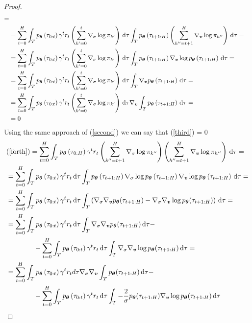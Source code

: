 \begin{proof}
\begin{align*}
=\\ &= 
\sum_{t=0}^{H}\int_{T}p_{{\boldsymbol{\theta}}}\left(\tau_{0:t}\right)\gamma^{t}r_{t}\left(\sum_{k'=0}^{t}\nabla_{\sigma}\log\pi_{k'}\right)\, \textrm{d}\tau
\int_{T}p_{{\boldsymbol{\theta}}}\left(\tau_{t+1:H}\right)\left(\sum_{h''=t+1}^{H}\nabla_{\boldsymbol{v}}\log\pi_{h''}\right)\, \textrm{d}\tau 
=\\ &= 
\sum_{t=0}^{H}\int_{T}p_{{\boldsymbol{\theta}}}\left(\tau_{0:t}\right)\gamma^{t}r_{t}\left(\sum_{k'=0}^{t}\nabla_{\sigma}\log\pi_{k'}\right)\, \textrm{d}\tau\int_{T}p_{{\boldsymbol{\theta}}}\left(\tau_{t+1:H}\right)\nabla_{\boldsymbol{v}}\log p_{{\boldsymbol{\theta}}}\left(\tau_{t+1:H}\right)\, \textrm{d}\tau
=\\ &=
\sum_{t=0}^{H}\int_{T}p_{{\boldsymbol{\theta}}}\left(\tau_{0:t}\right)\gamma^{t}r_{t}\left(\sum_{k'=0}^{t}\nabla_{\sigma}\log\pi_{k'}\right)\, \textrm{d}\tau\int_{T}\nabla_{\boldsymbol{v}} p_{{\boldsymbol{\theta}}}\left(\tau_{t+1:H}\right)\, \textrm{d}\tau
=\\ &=
\sum_{t=0}^{H}\int_{T}p_{{\boldsymbol{\theta}}}\left(\tau_{0:t}\right)\gamma^{t}r_{t}\left(\sum_{k'=0}^{t}\nabla_{\sigma}\log\pi_{k'}\right)\, \textrm{d}\tau\nabla_{\boldsymbol{v}}\int_{T} p_{{\boldsymbol{\theta}}}\left(\tau_{t+1:H}\right)\, \textrm{d}\tau
=\\ &= 0
\end{align*}
\normalsize
\allowdisplaybreaks[0]
Using the same approach of (\ref{second}) we can say that (\ref{third}) = 0
\allowdisplaybreaks
\small
\begin{align*}
&(\ref{forth})
=
\sum_{t=0}^{H}\int_{T}p_{\vtheta}\left(\tau_{0:H}\right)\gamma^{t}r_{t}\left(\gradlogsumpi{k''}{t+1}{H}{\sigma} \right)\left(\gradlogsumpi{h''}{t+1}{H}{\vv} \right)\de\tau
= \\ &=
\sum_{t=0}^{H}\int_{T}p_{\vtheta}\left(\tau_{0:t}\right)\gamma^{t}r_{t}\de\tau\int_{T}p_{\vtheta}\left(\tau_{t+1:H}\right)\nabla_{\sigma}\log p_{\vtheta}\left(\tau_{t+1:H}\right)\nabla_{\vv}\log p_{\vtheta}\left(\tau_{t+1:H}\right)\de\tau
= \\ &=
\sum_{t=0}^{H}\int_{T}p_{\vtheta}\left(\tau_{0:t}\right)\gamma^{t}r_{t}\de\tau\int_{T}\left( \nabla_{\sigma}\nabla_{\vv}p_{\vtheta}(\tau_{t+1:H}) - \nabla_{\sigma}\nabla_{\vv}\log p_{\vtheta}(\tau_{t+1:H}) \right)\de\tau
= \\ &=
\sum_{t=0}^{H}\int_{T}p_{\vtheta}\left(\tau_{0:t}\right)\gamma^{t}r_{t}\de\tau\int_{T} \nabla_{\sigma}\nabla_{\vv}p_{\vtheta}(\tau_{t+1:H})\de\tau -\\&\qquad\qquad- \sum_{t=0}^{H}\int_{T}p_{\vtheta}\left(\tau_{0:t}\right)\gamma^{t}r_{t}\de\tau\int_{T}\nabla_{\sigma}\nabla_{\vv}\log p_{\vtheta}(\tau_{t+1:H}) \de\tau
= \\ &=
\sum_{t=0}^{H}\int_{T}p_{\vtheta}\left(\tau_{0:t}\right)\gamma^{t}r_{t}d\tau\nabla_{\sigma}\nabla_{\vv}\int_{T} p_{\vtheta}(\tau_{t+1:H})\de\tau -\\&\qquad\qquad -\sum_{t=0}^{H}\int_{T}p_{\vtheta}\left(\tau_{0:t}\right)\gamma^{t}r_{t}\de\tau\int_{T}-\frac{2}{\sigma}p_{\vtheta}(\tau_{t+1:H})\nabla_{\vv}\log p_{\vtheta}(\tau_{t+1:H}) \de\tau

\end{align*}
\end{proof}
